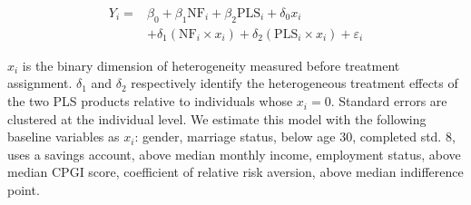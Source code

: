 \documentclass[11pt]{article}
\begin{document}
		\begin{equation} \begin{split}
		Y_{i} = & \beta_{0} + \beta_{1}\text{NF}_{i} + \beta_{2}\text{PLS}_{i} + \delta_{0}x_{i} \\
					& + \delta_{1}(\text{NF}_{i} \times x_{i}) + \delta_{2}(\text{PLS}_{i} \times x_{i}) + \varepsilon_{i}
		\end{split} \label{eq:heteffect} \end{equation}

		$x_{i}$ is the binary dimension of heterogeneity measured before treatment assignment. $\delta_{1}$ and $\delta_{2}$ respectively identify the heterogeneous treatment effects of the two PLS products relative to individuals whose $x_{i} = 0$. Standard errors are clustered at the individual level. We estimate this model with the following baseline variables as $x_{i}$: gender, marriage status, below age 30, completed std. 8, uses a savings account, above median monthly income, employment status, above median CPGI score, coefficient of relative risk aversion, above median indifference point.
\end{document}

